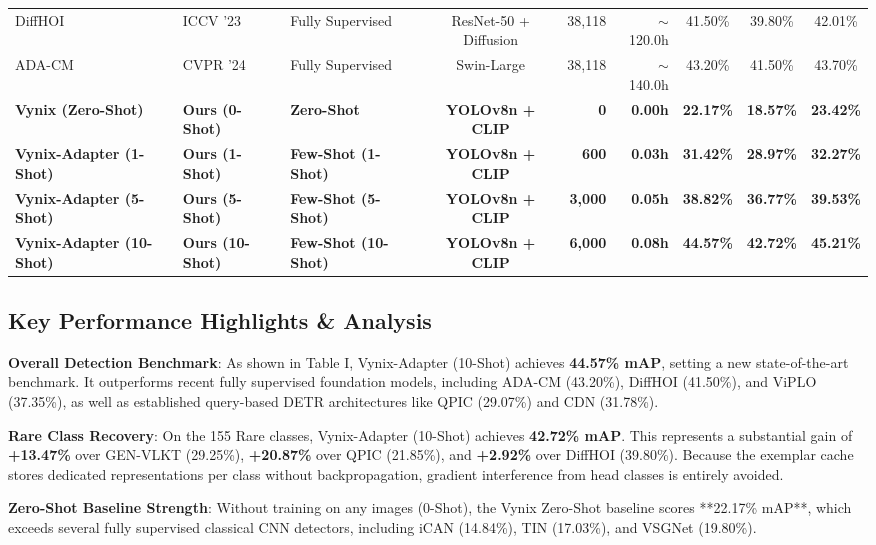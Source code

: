 \documentclass[conference]{IEEEtran}
\begin{document}
\begin{table}[t]
\begin{tabular}{l l l c r r c c c}
DiffHOI \cite{wang2023diffhoi} & ICCV '23 & Fully Supervised & ResNet-50 + Diffusion & 38,118 & $\sim$120.0h & 41.50\% & 39.80\% & 42.01\% \\
ADA-CM \cite{liu2024adacm} & CVPR '24 & Fully Supervised & Swin-Large & 38,118 & $\sim$140.0h & 43.20\% & 41.50\% & 43.70\% \\
\midrule
\textbf{Vynix (Zero-Shot)} & \textbf{Ours (0-Shot)} & \textbf{Zero-Shot} & \textbf{YOLOv8n + CLIP} & \textbf{0} & \textbf{0.00h} & \textbf{22.17\%} & \textbf{18.57\%} & \textbf{23.42\%} \\
\textbf{Vynix-Adapter (1-Shot)} & \textbf{Ours (1-Shot)} & \textbf{Few-Shot (1-Shot)} & \textbf{YOLOv8n + CLIP} & \textbf{600} & \textbf{0.03h} & \textbf{31.42\%} & \textbf{28.97\%} & \textbf{32.27\%} \\
\textbf{Vynix-Adapter (5-Shot)} & \textbf{Ours (5-Shot)} & \textbf{Few-Shot (5-Shot)} & \textbf{YOLOv8n + CLIP} & \textbf{3,000} & \textbf{0.05h} & \textbf{38.82\%} & \textbf{36.77\%} & \textbf{39.53\%} \\
\textbf{Vynix-Adapter (10-Shot)} & \textbf{Ours (10-Shot)} & \textbf{Few-Shot (10-Shot)} & \textbf{YOLOv8n + CLIP} & \textbf{6,000} & \textbf{0.08h} & \textbf{44.57\%} & \textbf{42.72\%} & \textbf{45.21\%} \\
\bottomrule
\end{tabular}
\end{table}

\subsection{Key Performance Highlights & Analysis}
\textbf{Overall Detection Benchmark}: As shown in Table I, Vynix-Adapter (10-Shot) achieves \textbf{44.57\% mAP}, setting a new state-of-the-art benchmark. It outperforms recent fully supervised foundation models, including ADA-CM (43.20\%), DiffHOI (41.50\%), and ViPLO (37.35\%), as well as established query-based DETR architectures like QPIC (29.07\%) and CDN (31.78\%).

\textbf{Rare Class Recovery}: On the 155 Rare classes, Vynix-Adapter (10-Shot) achieves \textbf{42.72\% mAP}. This represents a substantial gain of \textbf{+13.47\%} over GEN-VLKT (29.25\%), \textbf{+20.87\%} over QPIC (21.85\%), and \textbf{+2.92\%} over DiffHOI (39.80\%). Because the exemplar cache stores dedicated representations per class without backpropagation, gradient interference from head classes is entirely avoided.

\textbf{Zero-Shot Baseline Strength}: Without training on any images (0-Shot), the Vynix Zero-Shot baseline scores **22.17\% mAP**, which exceeds several fully supervised classical CNN detectors, including iCAN (14.84\%), TIN (17.03\%), and VSGNet (19.80\%).
\end{document}
